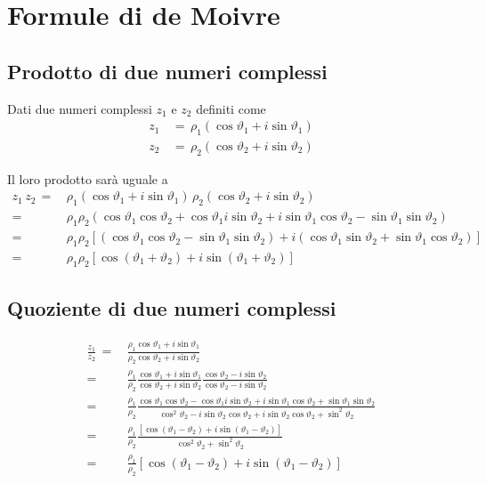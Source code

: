\documentclass[../../analisi1]{subfiles}
\begin{document}
    \chapter{Formule di de Moivre}

        \section*{Prodotto di due numeri complessi}

            Dati due numeri complessi \(z_1\) e \(z_2\) definiti come
            \begin{align*}
                z_1 \, &= \, \rho_1(\cos\vartheta_1 + i\sin\vartheta_1)\\
                z_2 \, &= \, \rho_2(\cos\vartheta_2 + i\sin\vartheta_2)
            \end{align*}

            Il loro prodotto sarà uguale a
            \begin{align*}
                z_1 \, z_2 \, =& \, \rho_1(\cos\vartheta_1+i\sin\vartheta_1) \, \rho_2(\cos\vartheta_2+i\sin\vartheta_2)\\
                       =& \, \rho_1\rho_2 (\cos\vartheta_1\cos\vartheta_2 + \cos\vartheta_1i\sin\vartheta_2 + i\sin\vartheta_1\cos\vartheta_2 - \sin\vartheta_1\sin\vartheta_2) \\
                       =& \, \rho_1\rho_2 [(\cos\vartheta_1\cos\vartheta_2 - \sin\vartheta_1\sin\vartheta_2) + i(\cos\vartheta_1 \sin\vartheta_2 + \sin\vartheta_1\cos\vartheta_2)] \\
                       =& \, \rho_1\rho_2 [\cos(\vartheta_1 + \vartheta_2) + i\sin(\vartheta_1 + \vartheta_2)]
            \end{align*}

        \section*{Quoziente di due numeri complessi}

            \begin{align*}
                \frac{z_1}{z_2} \, =& \, \frac{\rho_1\cos\vartheta_1+i\sin\vartheta_1}{\rho_2\cos\vartheta_2+i\sin\vartheta_2} \\
                                =& \, \frac{\rho_1}{\rho_2} \frac{\cos\vartheta_1+i\sin\vartheta_1}{\cos\vartheta_2+i\sin\vartheta_2} \frac{\cos\vartheta_2-i\sin\vartheta_2}{\cos\vartheta_2-i\sin\vartheta_2}\\
                                =& \, \frac{\rho_1}{\rho_2} \frac{\cos\vartheta_1\cos\vartheta_2 - \cos\vartheta_1 i\sin\vartheta_2 + i\sin\vartheta_1\cos\vartheta_2 + \sin\vartheta_1\sin\vartheta_2}{\cos^2\vartheta_2 - i\sin\vartheta_2\cos\vartheta_2 + i\sin\vartheta_2\cos\vartheta_2 + \sin^2\vartheta_2} \\
                                =& \, \frac{\rho_1}{\rho_2} \frac{[\cos(\vartheta_1 - \vartheta_2) + i\sin(\vartheta_1 - \vartheta_2)]}{\cos^2\vartheta_2 + \sin^2\vartheta_2} \\
                                =& \, \frac{\rho_1}{\rho_2} [\cos(\vartheta_1 - \vartheta_2) + i\sin(\vartheta_1 - \vartheta_2)]
            \end{align*}
\end{document}
